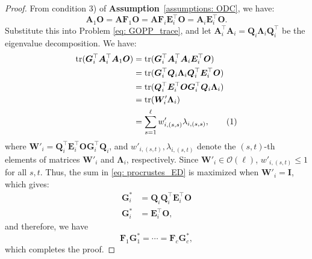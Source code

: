 \documentclass[10pt,a4paper]{amsart}
\newcommand{\matr}[1]{\bm{#1}}        %
\newcommand{\tr}{\operatorname{tr}}
\begin{document}
\begin{proof}
From condition 3) of \textbf{Assumption}~\ref{assumptions: ODC}, we have:
\begin{equation}
\matr{A}_1 \matr{O} = \matr{A} \matr{F}_1 \matr{O} = \matr{A} \matr{F}_i \matr{E}_{i}^\top \matr{O} = \matr{A}_i \matr{E}_{i}^\top \matr{O}.
\end{equation}
Substitute this into Problem \eqref{eq: GOPP_trace}, and let \(\matr{A}_i^\top \matr{A}_i = \matr{Q}_i \matr{\Lambda}_i \matr{Q}_i^\top\) be the eigenvalue decomposition. We have:
\begin{align*}
    \tr(\matr{G}_i^\top \matr{A}_i^\top \matr{A}_1 \matr{O}) &= \tr(\matr{G}_i^\top \matr{A}_i^\top \matr{A}_i \matr{E}_{i}^\top \matr{O} ) \\
                                             &= \tr(\matr{G}_i^\top \matr{Q}_i \matr{\Lambda}_i \matr{Q}_i^\top \matr{E}_{i}^\top \matr{O} ) \\
                                             &= \tr(\matr{Q}_i^\top \matr{E}_{i}^\top \matr{O} \matr{G}_i^\top \matr{Q}_i \matr{\Lambda}_i ) \\
                                             &= \tr(\matr{W}'_i \matr{\Lambda}_i) \\
                                             &= \sum_{s=1}^{\ell} w'_{i,(s,s)} \lambda_{i,(s,s)},
                                                 \stepcounter{equation}\tag{\theequation}\label{eq: procrustes_ED}
\end{align*}
where \(\matr{W}'_i = \matr{Q}_i^\top \matr{E}_{i}^\top \matr{O} \matr{G}_i^\top \matr{Q}_i\), and \(w'_{i,(s,t)}, \lambda_{i,(s,t)}\) denote the \((s,t)\)-th elements of matrices \(\matr{W}'_i\) and \(\matr{\Lambda}_i\), respectively. Since \(\matr{W}'_i \in \mathcal{O}(\ell)\), \(w'_{i,(s,t)} \leq 1\) for all \(s, t\). Thus, the sum in \eqref{eq: procrustes_ED} is maximized when \(\matr{W}'_i = \matr{I}\), which gives:
\begin{align*}
    \matr{G}_i^* &= \matr{Q}_i \matr{Q}_i^\top \matr{E}_{i}^\top \matr{O} \\
    \matr{G}_i^* &= \matr{E}_{i}^\top \matr{O},
\end{align*}
and therefore, we have
\begin{equation}
\matr{F}_1 \matr{G}_1^* = \cdots = \matr{F}_c \matr{G}_c^*,
\end{equation}
which completes the proof.
\end{proof}
\end{document}

